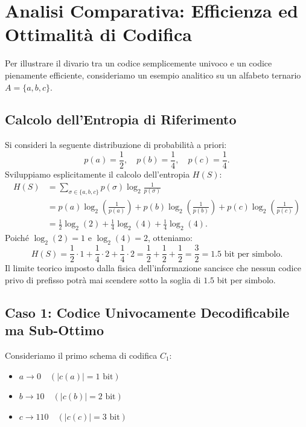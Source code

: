 \FloatBarrier
\section{Analisi Comparativa: Efficienza ed Ottimalit\`a di Codifica}
\label{sec:analisi-comparativa-codici}

Per illustrare il divario tra un codice semplicemente univoco e un codice pienamente efficiente, consideriamo un esempio analitico su un alfabeto ternario $A = \{a, b, c\}$.

\FloatBarrier
\subsection{Calcolo dell'Entropia di Riferimento}
\label{subsec:calcolo-entropia-riferimento}

Si consideri la seguente distribuzione di probabilit\`a a priori:
\begin{equation}
  p(a) = \frac{1}{2}, \quad p(b) = \frac{1}{4}, \quad p(c) = \frac{1}{4}.
\end{equation}
Sviluppiamo esplicitamente il calcolo dell'entropia $H(S)$:
\begin{align}
  H(S) &= \sum_{\sigma \in \{a,b,c\}} p(\sigma) \log_2 \frac{1}{p(\sigma)} \nonumber \\
  &= p(a) \log_2\left(\frac{1}{p(a)}\right) + p(b) \log_2\left(\frac{1}{p(b)}\right) + p(c) \log_2\left(\frac{1}{p(c)}\right) \nonumber \\
  &= \frac{1}{2} \log_2(2) + \frac{1}{4} \log_2(4) + \frac{1}{4} \log_2(4).
\end{align}
Poich\'e $\log_2(2) = 1$ e $\log_2(4) = 2$, otteniamo:
\begin{equation}
  H(S) = \frac{1}{2} \cdot 1 + \frac{1}{4} \cdot 2 + \frac{1}{4} \cdot 2 = \frac{1}{2} + \frac{1}{2} + \frac{1}{2} = \frac{3}{2} = 1.5 \text{ bit per simbolo}.
\end{equation}
Il limite teorico imposto dalla fisica dell'informazione sancisce che nessun codice privo di prefisso potr\`a mai scendere sotto la soglia di $1.5$ bit per simbolo.

\FloatBarrier
\subsection{Caso 1: Codice Univocamente Decodificabile ma Sub-Ottimo}
\label{subsec:caso-1-subottimo}

Consideriamo il primo schema di codifica $C_1$:
\begin{itemize}
  \item $a \to 0 \quad (|c(a)| = 1 \text{ bit})$
  \item $b \to 10 \quad (|c(b)| = 2 \text{ bit})$
  \item $c \to 110 \quad (|c(c)| = 3 \text{ bit})$
\end{itemize}

